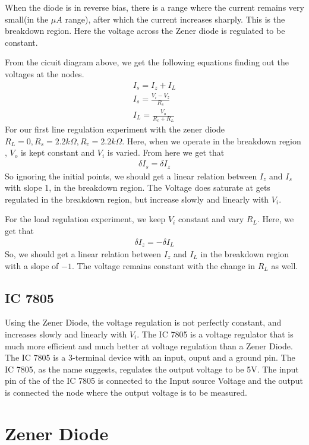 \documentclass{scrartcl}
\newcommand{\1}{\mathbbm{1}}
\begin{document}
When the diode is in reverse bias, there is a range where the current remains very small(in the 
$\mu A$ range), after which the current increases sharply. This is the breakdown region. Here the 
voltage across the Zener diode is regulated to be constant.

From the cicuit diagram above, we get the following equations finding out the voltages at the nodes.
\begin{align}
	I_s = I_z + I_L \\ 
	I_s = \frac{V_i - V_z}{R_s} \\
	I_L = \frac{V_o}{R_c+R_L}
\end{align}
For our first line regulation experiment with the zener diode $R_L = 0, R_s = 2.2k\Omega, R_c = 2.2k\Omega$.
Here, when we operate in the breakdown region , $V_o$ is kept constant and $V_i$ is varied. From here 
we get that 
\begin{align}
	\delta I_s = \delta I_z
\end{align}
So ignoring the initial points, we should get a linear relation between $I_z$ and $I_s$ with slope 1, in the
breakdown region. The Voltage does saturate at gets regulated in the breakdown region, but
increase slowly and linearly with $V_i$.

For the load regulation experiment, we keep $V_i$ constant and vary $R_L$. Here, we get that
\begin{align}
	\delta I_z = -\delta I_L
\end{align}
So, we should get a linear relation between $I_z$ and $I_L$ in the breakdown region with 
a slope of $-1$. The voltage remains constant with the change in $R_L$ as well.
\subsection{IC 7805}
Using the Zener Diode, the voltage regulation is not perfectly constant, and increases 
slowly and linearly with $V_i$. The IC 7805 is a voltage regulator that is much more efficient
 and much better at voltage regulation than a Zener Diode. The IC 7805 is a 3-terminal device 
 with an input, ouput and a ground pin. The IC 7805, as the name suggests,
 regulates the output voltage to be 5V. The input pin of the of the IC 7805 is connected to the
 Input source Voltage and the output is connected the node where the output voltage is to be measured.

\section{Zener Diode}
\end{document}
